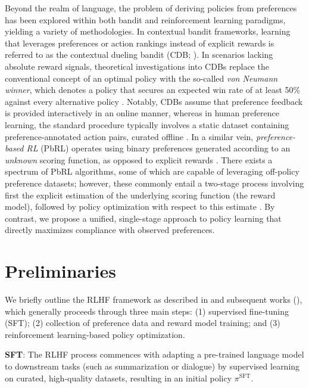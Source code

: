Beyond the realm of language, the problem of deriving policies from preferences has been explored within both bandit and reinforcement learning paradigms, yielding a variety of methodologies. In contextual bandit frameworks, learning that leverages preferences or action rankings instead of explicit rewards is referred to as the contextual dueling bandit (CDB; \cite{yue2012karmed,dudik2015contextual}). In scenarios lacking absolute reward signals, theoretical investigations into CDBs replace the conventional concept of an optimal policy with the so-called \textit{von Neumann winner}, which denotes a policy that secures an expected win rate of at least 50\% against every alternative policy \citep{dudik2015contextual}. Notably, CDBs assume that preference feedback is provided interactively in an online manner, whereas in human preference learning, the standard procedure typically involves a static dataset containing preference-annotated action pairs, curated offline \citep{yan2022human}. In a similar vein, \textit{preference-based RL} (PbRL) operates using binary preferences generated according to an \textit{unknown} scoring function, as opposed to explicit rewards \citep{BusaFekete2014,ruiz2023dueling}. There exists a spectrum of PbRL algorithms, some of which are capable of leveraging off-policy preference datasets; however, these commonly entail a two-stage process involving first the explicit estimation of the underlying scoring function (the reward model), followed by policy optimization with respect to this estimate \citep{jain2013learning,BusaFekete2014,christiano2017deep,sadigh2017active,kupcsik2018learning}. By contrast, we propose a unified, single-stage approach to policy learning that directly maximizes compliance with observed preferences.

\section{Preliminaries}\label{section:prelims}

We briefly outline the RLHF framework as described in \citeauthor{ziegler2020finetuning} and subsequent works (\citep{stiennon2022learning, bai2022training, ouyang2022training}), which generally proceeds through three main steps: (1) supervised fine-tuning (SFT); (2) collection of preference data and reward model training; and (3) reinforcement learning-based policy optimization.

\textbf{SFT}: The RLHF process commences with adapting a pre-trained language model to downstream tasks (such as summarization or dialogue) by supervised learning on curated, high-quality datasets, resulting in an initial policy $\pi^\text{SFT}$.

